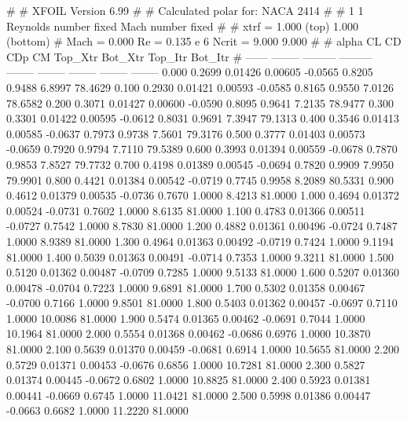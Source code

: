 #  
#       XFOIL         Version 6.99
#  
# Calculated polar for: NACA 2414                                       
#  
# 1 1 Reynolds number fixed          Mach number fixed         
#  
# xtrf =   1.000 (top)        1.000 (bottom)  
# Mach =   0.000     Re =     0.135 e 6     Ncrit =   9.000  9.000
#  
#   alpha    CL        CD       CDp       CM     Top_Xtr  Bot_Xtr  Top_Itr  Bot_Itr
#  ------ -------- --------- --------- -------- -------- -------- -------- --------
   0.000   0.2699   0.01426   0.00605  -0.0565   0.8205   0.9488   6.8997  78.4629
   0.100   0.2930   0.01421   0.00593  -0.0585   0.8165   0.9550   7.0126  78.6582
   0.200   0.3071   0.01427   0.00600  -0.0590   0.8095   0.9641   7.2135  78.9477
   0.300   0.3301   0.01422   0.00595  -0.0612   0.8031   0.9691   7.3947  79.1313
   0.400   0.3546   0.01413   0.00585  -0.0637   0.7973   0.9738   7.5601  79.3176
   0.500   0.3777   0.01403   0.00573  -0.0659   0.7920   0.9794   7.7110  79.5389
   0.600   0.3993   0.01394   0.00559  -0.0678   0.7870   0.9853   7.8527  79.7732
   0.700   0.4198   0.01389   0.00545  -0.0694   0.7820   0.9909   7.9950  79.9901
   0.800   0.4421   0.01384   0.00542  -0.0719   0.7745   0.9958   8.2089  80.5331
   0.900   0.4612   0.01379   0.00535  -0.0736   0.7670   1.0000   8.4213  81.0000
   1.000   0.4694   0.01372   0.00524  -0.0731   0.7602   1.0000   8.6135  81.0000
   1.100   0.4783   0.01366   0.00511  -0.0727   0.7542   1.0000   8.7830  81.0000
   1.200   0.4882   0.01361   0.00496  -0.0724   0.7487   1.0000   8.9389  81.0000
   1.300   0.4964   0.01363   0.00492  -0.0719   0.7424   1.0000   9.1194  81.0000
   1.400   0.5039   0.01363   0.00491  -0.0714   0.7353   1.0000   9.3211  81.0000
   1.500   0.5120   0.01362   0.00487  -0.0709   0.7285   1.0000   9.5133  81.0000
   1.600   0.5207   0.01360   0.00478  -0.0704   0.7223   1.0000   9.6891  81.0000
   1.700   0.5302   0.01358   0.00467  -0.0700   0.7166   1.0000   9.8501  81.0000
   1.800   0.5403   0.01362   0.00457  -0.0697   0.7110   1.0000  10.0086  81.0000
   1.900   0.5474   0.01365   0.00462  -0.0691   0.7044   1.0000  10.1964  81.0000
   2.000   0.5554   0.01368   0.00462  -0.0686   0.6976   1.0000  10.3870  81.0000
   2.100   0.5639   0.01370   0.00459  -0.0681   0.6914   1.0000  10.5655  81.0000
   2.200   0.5729   0.01371   0.00453  -0.0676   0.6856   1.0000  10.7281  81.0000
   2.300   0.5827   0.01374   0.00445  -0.0672   0.6802   1.0000  10.8825  81.0000
   2.400   0.5923   0.01381   0.00441  -0.0669   0.6745   1.0000  11.0421  81.0000
   2.500   0.5998   0.01386   0.00447  -0.0663   0.6682   1.0000  11.2220  81.0000
